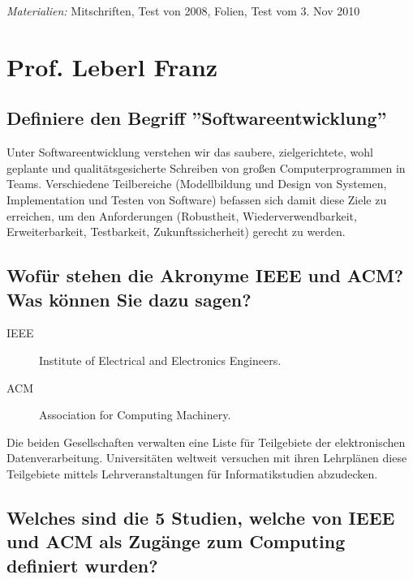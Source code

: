 
\newcommand{\uncertain}{\fbox{Vorsicht!}
    Lösung nicht in Materialien vorhanden. Kein Gewähr auf Korrektheit}
\maketitle

\emph{Materialien:} Mitschriften, Test von 2008, Folien, Test vom 3. Nov 2010

\section{Prof. Leberl Franz}

\subsection{Definiere den Begriff ''Softwareentwicklung''}

Unter Softwareentwicklung verstehen wir das saubere, zielgerichtete, wohl
geplante und qualitätsgesicherte Schreiben von großen Computerprogrammen in
Teams. Verschiedene Teilbereiche (Modellbildung und Design von Systemen,
Implementation und Testen von Software) befassen sich damit diese Ziele zu
erreichen, um den Anforderungen (Robustheit, Wiederverwendbarkeit,
Erweiterbarkeit, Testbarkeit, Zukunftssicherheit) gerecht zu werden.

\subsection{Wofür stehen die Akronyme IEEE und ACM?
    Was können Sie dazu sagen?}

\begin{description}
  \item[IEEE] Institute of Electrical and Electronics Engineers.
  \item[ACM] Association for Computing Machinery.
\end{description}

Die beiden Gesellschaften verwalten eine Liste für Teilgebiete der
elektronischen Datenverarbeitung. Universitäten weltweit versuchen
mit ihren Lehrplänen diese Teilgebiete mittels Lehrveranstaltungen
für Informatikstudien abzudecken.

\subsection{Welches sind die 5 Studien, welche von IEEE und ACM als Zugänge
    zum Computing definiert wurden?}

